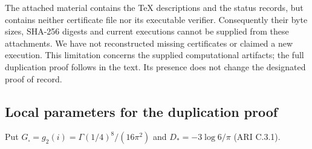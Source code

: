 \documentclass[11pt,a4paper]{article}
\theoremstyle{plain}
\theoremstyle{definition}
\begin{document}
The attached material contains the TeX descriptions and the status records, but contains neither certificate file nor its executable verifier. Consequently their byte sizes, SHA-256 digests and current executions cannot be supplied from these attachments. We have not reconstructed missing certificates or claimed a new execution. This limitation concerns the supplied computational artifacts; the full duplication proof follows in the text. Its presence does not change the designated proof of record.

\subsection{Local parameters for the duplication proof}
Put $G_\square=g_2(i)=\Gamma(1/4)^8/(16\pi^2)$ and $D_*=-3\log6/\pi$ (ARI C.3.1).
\end{document}
